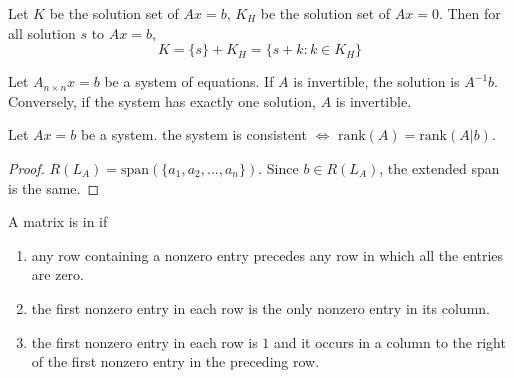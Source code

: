\begin{theorem}\label{equationfromoneandnullspace}
	Let $K$ be the solution set of $Ax=b$, $K_H$ be the solution set of $Ax=0$. Then for all solution $s$ to $Ax=b$,
	\begin{equation}
		K = \{ s \} + K_H = \{s+k: k \in K_H \}
	\end{equation}
\end{theorem}


\begin{theorem}
	Let $A_{n \times n}x=b$ be a system of equations. If $A$ is invertible, the solution is $A^{-1}b$. Conversely, if the system has exactly one solution, $A$ is invertible.
\end{theorem}



\begin{theorem}
	Let $Ax=b$ be a system. the system is consistent $\Leftrightarrow$ $\text{rank}(A) = \text{rank}(A|b)$.
\end{theorem}

\begin{proof}
    $R(L_A) = \text{span}(\{a_1, a_2, \dots, a_n \})$. Since $b \in R(L_A)$, the extended span is the same.
\end{proof}


\begin{definition}
	A matrix is in  if 
	\begin{enumerate}
		\item any row containing a nonzero entry precedes any row in which all the entries are zero.
		\item the first nonzero entry in each row is the only nonzero entry in its column.
		\item the first nonzero entry in each row is $1$ and it occurs in a column to the right of the first nonzero entry in the preceding row.
	\end{enumerate}
\end{definition}






